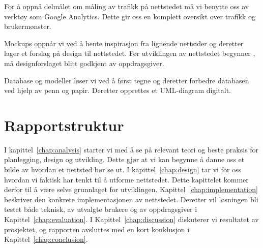 For å oppnå delmålet om måling av trafikk på nettstedet må vi benytte oss av verktøy som Google Analytics. Dette gir oss en komplett oversikt over trafikk og brukermønster.

Mockups oppnår vi ved å hente inspirasjon fra lignende nettsider og deretter lager et forslag på design til nettstedet. Før utviklingen av nettstedet begynner , må designforslaget blitt godkjent av oppdragsgiver.

Database og modeller løser vi ved å først tegne og deretter forbedre databasen ved hjelp av penn og papir. Deretter opprettes et UML-diagram digitalt.

\section{Rapportstruktur}



I kapittel~\ref{chap:analysis} starter vi med å se på relevant teori og beste praksis for planlegging, design og utvikling. Dette gjør at vi kan begynne å danne oss et bilde av hvordan et nettsted bør se ut. I kapittel~\ref{chap:design} tar vi for oss hvordan vi faktisk har tenkt til å utforme nettstedet. Dette kapittelet kommer derfor til å være selve grunnlaget for utviklingen. Kapittel~\ref{chap:implementation} beskriver den konkrete implementasjonen av nettstedet. Deretter vil løsningen bli testet både teknisk, av utvalgte brukere og av oppdragsgiver i Kapittel~\ref{chap:evaluation}. I Kapittel~\ref{chap:discussion} diskuterer vi resultatet av prosjektet, og rapporten avsluttes med en kort konklusjon i Kapittel~\ref{chap:conclusion}.
